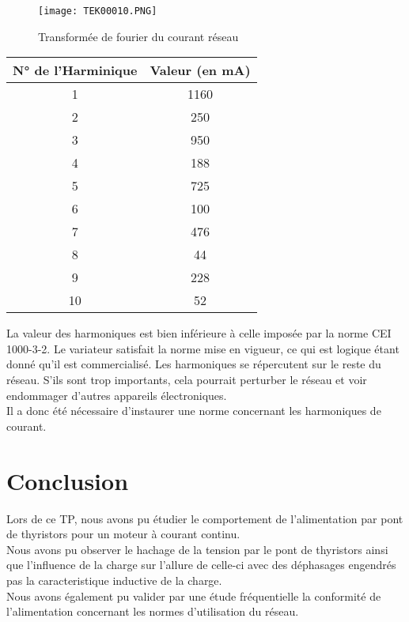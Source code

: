 \documentclass[oneside,a4paper,12pt]{article}
\begin{document}
	\begin{figure}[h]
		\centering
		\texttt{[image: TEK00010.PNG]}
		\caption{Transformée de fourier du courant réseau}
	\end{figure}

	\begin{center}
	\begin{tabular}{|c|c|}
		\hline
		N° de l'Harminique & Valeur (en mA)\\
		\hline
		1 & 1160\\
		\hline
		2 & 250\\
		\hline
		3 & 950\\
		\hline
		4 & 188\\
		\hline
		5 & 725\\
		\hline
		6 & 100\\
		\hline
		7 & 476\\
		\hline
		8 & 44\\
		\hline
		9 & 228\\
		\hline
		10 & 52\\
		\hline
	\end{tabular}
	\end{center}

	La valeur des harmoniques est bien inférieure à celle imposée par la norme CEI 1000-3-2. Le variateur satisfait la norme mise en vigueur, ce qui est logique étant donné qu’il est commercialisé.
	Les harmoniques se répercutent sur le reste du réseau. S'ils sont trop importants, cela pourrait perturber le réseau et voir endommager d’autres appareils électroniques.\\
	Il a donc été nécessaire d’instaurer une norme concernant les harmoniques de courant. 
	
	\section{Conclusion}
	
	Lors de ce TP, nous avons pu étudier le comportement de l'alimentation par pont de thyristors pour un moteur à courant continu.\\
	Nous avons pu observer le hachage de la tension par le pont de thyristors ainsi que l'influence de la charge sur l'allure de celle-ci avec des déphasages engendrés pas la caracteristique inductive de la charge.\\
	
	Nous avons également pu valider par une étude fréquentielle la conformité de l'alimentation concernant les normes d'utilisation du réseau.\\
	
\end{document}
